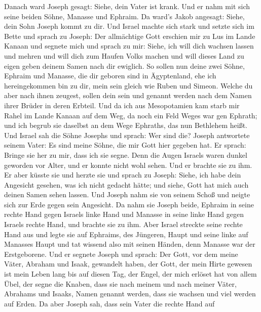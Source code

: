  Danach ward Joseph gesagt: Siehe, dein Vater ist krank.
Und er nahm mit sich seine beiden Söhne, Manasse und Ephraim.
 Da ward's Jakob angesagt: Siehe, dein Sohn Joseph kommt
zu dir. Und Israel machte sich stark und setzte sich im Bette
 und sprach zu Joseph: Der allmächtige Gott erschien mir
zu Lus im Lande Kanaan und segnete mich  und sprach zu
mir: Siehe, ich will dich wachsen lassen und mehren und will dich zum
Haufen Volks machen und will dieses Land zu eigen geben deinem Samen
nach dir ewiglich.  So sollen nun deine zwei Söhne,
Ephraim und Manasse, die dir geboren sind in Ägyptenland, ehe ich
hereingekommen bin zu dir, mein sein gleich wie Ruben und Simeon.
 Welche du aber nach ihnen zeugest, sollen dein sein und
genannt werden nach dem Namen ihrer Brüder in deren Erbteil.
 Und da ich aus Mesopotamien kam starb mir Rahel im Lande
Kanaan auf dem Weg, da noch ein Feld Weges war gen Ephrath; und ich
begrub sie daselbst an dem Wege Ephraths, das nun Bethlehem heißt.
 Und Israel sah die Söhne Josephs und sprach: Wer sind
die?  Joseph antwortete seinem Vater: Es sind meine Söhne,
die mir Gott hier gegeben hat. Er sprach: Bringe sie her zu mir, dass
ich sie segne.  Denn die Augen Israels waren dunkel
geworden vor Alter, und er konnte nicht wohl sehen. Und er brachte sie
zu ihm. Er aber küsste sie und herzte sie  und sprach zu
Joseph: Siehe, ich habe dein Angesicht gesehen, was ich nicht gedacht
hätte; und siehe, Gott hat mich auch deinen Samen sehen lassen.
 Und Joseph nahm sie von seinem Schoß und neigte sich zur
Erde gegen sein Angesicht.  Da nahm sie Joseph beide,
Ephraim in seine rechte Hand gegen Israels linke Hand und Manasse in
seine linke Hand gegen Israels rechte Hand, und brachte sie zu ihm.
 Aber Israel streckte seine rechte Hand aus und legte sie
auf Ephraims, des Jüngeren, Haupt und seine linke auf Manasses Haupt und
tat wissend also mit seinen Händen, denn Manasse war der Erstgeborene.
 Und er segnete Joseph und sprach: Der Gott, vor dem
meine Väter, Abraham und Isaak, gewandelt haben, der Gott, der mein
Hirte gewesen ist mein Leben lang bis auf diesen Tag, 
der Engel, der mich erlöset hat von allem Übel, der segne die Knaben,
dass sie nach meinem und nach meiner Väter, Abrahams und Isaaks, Namen
genannt werden, dass sie wachsen und viel werden auf Erden.
 Da aber Joseph sah, dass sein Vater die rechte Hand auf
